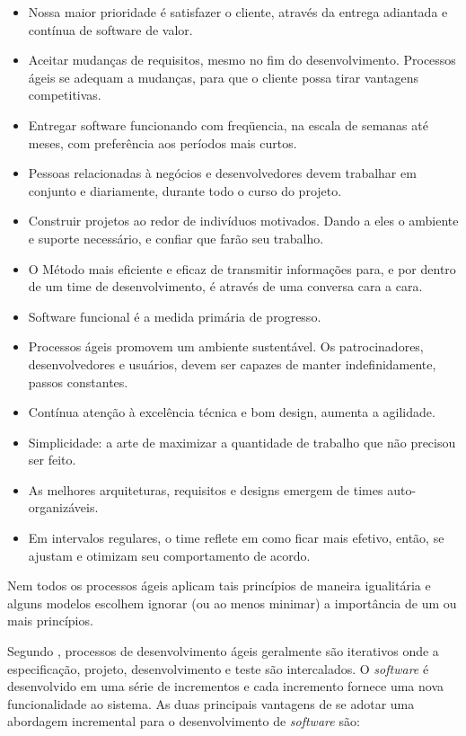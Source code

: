 \begin{itemize}
    \item Nossa maior prioridade é satisfazer o cliente, através da entrega adiantada e contínua de software de valor.
    \item Aceitar mudanças de requisitos, mesmo no fim do desenvolvimento. Processos ágeis se adequam a mudanças, para que o cliente possa tirar vantagens competitivas.
    \item Entregar software funcionando com freqüencia, na escala de semanas até meses, com preferência aos períodos mais curtos.
    \item Pessoas relacionadas à negócios e desenvolvedores devem trabalhar em conjunto e diariamente, durante todo o curso do projeto.
    \item Construir projetos ao redor de indivíduos motivados. Dando a eles o ambiente e suporte necessário, e confiar que farão seu trabalho.
    \item O Método mais eficiente e eficaz de transmitir informações para, e por dentro de um time de desenvolvimento, é através de uma conversa cara a cara.
    \item Software funcional é a medida primária de progresso.
    \item Processos ágeis promovem um ambiente sustentável. Os patrocinadores, desenvolvedores e usuários, devem ser capazes de manter indefinidamente, passos constantes.
    \item Contínua atenção à excelência técnica e bom design, aumenta a agilidade.
    \item Simplicidade: a arte de maximizar a quantidade de trabalho que não precisou ser feito.
    \item As melhores arquiteturas, requisitos e designs emergem de times auto-organizáveis.
    \item Em intervalos regulares, o time reflete em como ficar mais efetivo, então, se ajustam e otimizam seu comportamento de acordo.
\end{itemize}

Nem todos os processos ágeis aplicam tais princípios de maneira igualitária e alguns modelos escolhem ignorar (ou ao menos minimar) a importância de um ou mais princípios. \cite{pressman_2009}

Segundo \cite{sommerville_2006}, processos de desenvolvimento ágeis geralmente são iterativos onde a
especificação, projeto, desenvolvimento e teste são intercalados. O \textit{software} é desenvolvido
em uma série de incrementos e cada incremento fornece uma nova funcionalidade ao sistema. As duas principais
vantagens de se adotar uma abordagem incremental para o desenvolvimento de \textit{software} são:

